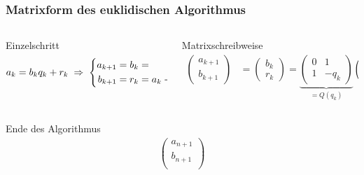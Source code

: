 %
%
%
\begin{frame}[t]
\frametitle{Matrixform des euklidischen Algorithmus}
\setlength{\abovedisplayskip}{5pt}
\setlength{\belowdisplayskip}{5pt}
\vspace{-20pt}
\begin{columns}[t,onlytextwidth]
\begin{column}{0.52\textwidth}
\begin{block}{Einzelschritt}
\vspace{-10pt}
\[
a_k = b_kq_k + r_k
\;\Rightarrow\;
\left\{
\begin{aligned}
a_{k+1} &= b_k = \phantom{a_k-q_k}\llap{$-\mathstrut$}b_k \\
b_{k+1} &= \phantom{b_k}\llap{$r_k$} = a_k - q_kb_k 
\end{aligned}
\right.
\]
\end{block}
\end{column}
\begin{column}{0.44\textwidth}
\begin{block}{Matrixschreibweise}
\vspace{-10pt}
\begin{align*}
\begin{pmatrix}
a_{k+1}\\
b_{k+1}
\end{pmatrix}
&=
\begin{pmatrix}
b_k\\r_k
\end{pmatrix}
=
\underbrace{\begin{pmatrix}0&1\\1&-q_k\end{pmatrix}}_{\displaystyle =Q(q_k)}
\begin{pmatrix}
a_k\\b_k
\end{pmatrix}
\end{align*}
\end{block}
\end{column}
\end{columns}
\vspace{-10pt}
\begin{block}{Ende des Algorithmus}
\vspace{-10pt}
\begin{align*}
\begin{pmatrix}
a_{n+1}\\
b_{n+1}\\
\end{pmatrix}

\end{align*}
\end{block}
\end{frame}
